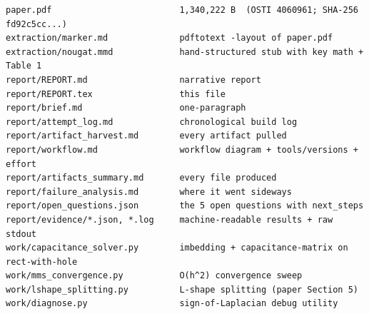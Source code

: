 \documentclass[11pt]{article}
\begin{document}
\begin{lstlisting}
paper.pdf                         1,340,222 B  (OSTI 4060961; SHA-256 fd92c5cc...)
extraction/marker.md              pdftotext -layout of paper.pdf
extraction/nougat.mmd             hand-structured stub with key math + Table 1
report/REPORT.md                  narrative report
report/REPORT.tex                 this file
report/brief.md                   one-paragraph
report/attempt_log.md             chronological build log
report/artifact_harvest.md        every artifact pulled
report/workflow.md                workflow diagram + tools/versions + effort
report/artifacts_summary.md       every file produced
report/failure_analysis.md        where it went sideways
report/open_questions.json        the 5 open questions with next_steps
report/evidence/*.json, *.log     machine-readable results + raw stdout
work/capacitance_solver.py        imbedding + capacitance-matrix on rect-with-hole
work/mms_convergence.py           O(h^2) convergence sweep
work/lshape_splitting.py          L-shape splitting (paper Section 5)
work/diagnose.py                  sign-of-Laplacian debug utility
\end{lstlisting}
\end{document}
